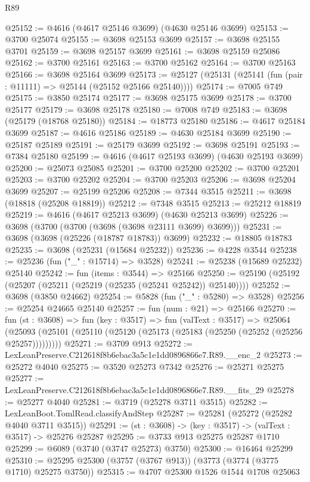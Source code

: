 \begin{lexlean}{R89}
\begin{coremodule}
@25152 := @4616 (@4617 @25146 @3699) (@4630 @25146 @3699)
@25153 := @3700 @25074
@25155 := @3698 @25153 @3699
@25157 := @3698 @25155 @3701
@25159 := @3698 @25157 @3699
@25161 := @3698 @25159 @25086
@25162 := @3700 @25161
@25163 := @3700 @25162
@25164 := @3700 @25163
@25166 := @3698 @25164 @3699
@25173 := @25127 (@25131 (@25141 (fun (pair : @11111) => @25144 (@25152 @25166 @25140))))
@25174 := @7005 @749
@25175 := @3850 @25174
@25177 := @3698 @25175 @3699
@25178 := @3700 @25177
@25179 := @3698 @25178
@25180 := @7008 @749
@25183 := @3698 (@25179 (@18768 @25180))
@25184 := @18773 @25180
@25186 := @4617 @25184 @3699
@25187 := @4616 @25186
@25189 := @4630 @25184 @3699
@25190 := @25187 @25189
@25191 := @25179 @3699
@25192 := @3698 @25191
@25193 := @7384 @25180
@25199 := @4616 (@4617 @25193 @3699) (@4630 @25193 @3699)
@25200 := @25073 @25085
@25201 := @3700 @25200
@25202 := @3700 @25201
@25203 := @3700 @25202
@25204 := @3700 @25203
@25206 := @3698 @25204 @3699
@25207 := @25199 @25206
@25208 := @7344 @3515
@25211 := @3698 (@18818 (@25208 @18819))
@25212 := @7348 @3515
@25213 := @25212 @18819
@25219 := @4616 (@4617 @25213 @3699) (@4630 @25213 @3699)
@25226 := @3698 (@3700 (@3700 (@3698 (@3698 @23111 @3699) @3699)))
@25231 := @3698 (@3698 (@25226 (@18787 @18783)) @3699)
@25232 := @18805 @18783
@25235 := @3698 (@25231 (@15684 @25232))
@25236 := @4228 @3544
@25238 := @25236 (fun ("_" : @15714) => @3528)
@25241 := @25238 (@15689 @25232) @25140
@25242 := fun (items : @3544) => @25166
@25250 := @25190 (@25192 (@25207 (@25211 (@25219 (@25235 (@25241 @25242)) @25140))))
@25252 := @3698 (@3850 @24662)
@25254 := @5828 (fun ("_" : @5280) => @3528)
@25256 := @25254 @24665 @25140
@25257 := fun (num : @21) => @25166
@25270 := fun (st : @3608) =>
  fun (key : @3517) =>
  fun (valText : @3517) =>
  @25064 (@25093 (@25101 (@25110 (@25120 (@25173 (@25183 (@25250 (@25252 (@25256 @25257)))))))))
@25271 := @3709 @913
@25272 := LexLeanPreserve.C212618f8b6ebac3a5c1e1dd0896866e7.R89.__enc_2
@25273 := @25272 @4040
@25275 := @3520 @25273 @7342
@25276 := @25271 @25275
@25277 := LexLeanPreserve.C212618f8b6ebac3a5c1e1dd0896866e7.R89.__fits_29
@25278 := @25277 @4040
@25281 := @3719 (@25278 @3711 @3515)
@25282 := LexLeanBoot.TomlRead.classifyAndStep
@25287 := @25281 (@25272 (@25282 @4040 @3711 @3515))
@25291 := (st : @3608) -> (key : @3517) -> (valText : @3517) -> @25276 @25287
@25295 := @3733 @913 @25275 @25287 @1710
@25299 := @6089 (@3740 (@3747 @25273) @3750)
@25300 := @16464 @25299
@25310 := @25295 @25300 (@3757 (@3767 @913)) (@3773 (@3774 (@3775 @1710) @25275 @3750))
@25315 := @4707 @25300 @1526 @1544 @1708 @25063

\end{coremodule}
\end{lexlean}
